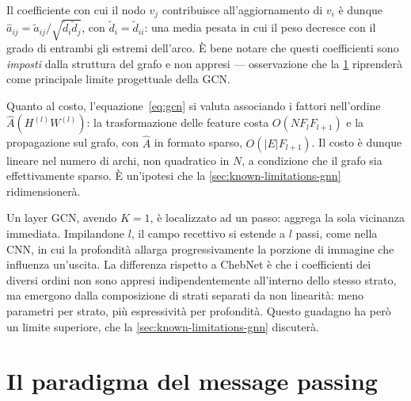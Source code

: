 Il coefficiente con cui il nodo $v_j$ contribuisce all'aggiornamento di $v_i$ è dunque $\hat a_{ij} = \tilde a_{ij}/\sqrt{\tilde d_i\tilde d_j}$, con $\tilde d_i = \tilde d_{ii}$: una media pesata in cui il peso decresce con il grado di entrambi gli estremi dell'arco. È bene notare che questi coefficienti sono \emph{imposti} dalla struttura del grafo e non appresi — osservazione che la \cref{sec:message-passing-paradigm} riprenderà come principale limite progettuale della GCN.

Quanto al costo, l'equazione~\eqref{eq:gcn} si valuta associando i fattori nell'ordine $\hat A(H^{(l)}W^{(l)})$: la trasformazione delle feature costa $O(NF_lF_{l+1})$ e la propagazione sul grafo, con $\hat A$ in formato sparso, $O(|E|F_{l+1})$. Il costo è dunque lineare nel numero di archi, non quadratico in $N$, a condizione che il grafo sia effettivamente sparso. È un'ipotesi che la \cref{sec:known-limitations-gnn} ridimensionerà.

Un layer GCN, avendo $K=1$, è localizzato ad un passo: aggrega la sola vicinanza immediata. Impilandone $l$, il campo recettivo si estende a $l$ passi, come nella CNN, in cui la profondità allarga progressivamente la porzione di immagine che influenza un'uscita. La differenza rispetto a ChebNet è che i coefficienti dei diversi ordini non sono appresi indipendentemente all'interno dello stesso strato, ma emergono dalla composizione di strati separati da non linearità: meno parametri per strato, più espressività per profondità. Questo guadagno ha però un limite superiore, che la \cref{sec:known-limitations-gnn} discuterà.

\section{Il paradigma del message passing}
\label{sec:message-passing-paradigm}

